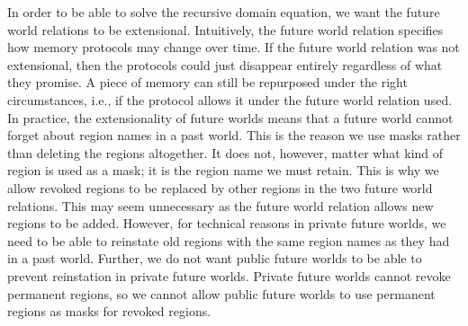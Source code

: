 \documentclass[format=acmsmall, review=true, screen=true]{acmart}
\newenvironment{toplas}{}{}
\begin{document}
\begin{toplas}
  In order to be able to solve the recursive domain equation, we want the future world relations to be extensional.
  Intuitively, the future world relation specifies how memory protocols may change over time.
  If the future world relation was not extensional, then the protocols could just disappear entirely regardless of what they promise.
  A piece of memory can still be repurposed under the right circumstances, i.e., if the protocol allows it under the future world relation used.
  In practice, the extensionality of future worlds means that a future world cannot forget about region names in a past world.
  This is the reason we use masks rather than deleting the regions altogether.
  It does not, however, matter what kind of region is used as a mask; it is the region name we must retain.
  This is why we allow revoked regions to be replaced by other regions in the two future world relations.
  This may seem unnecessary as the future world relation allows new regions to be added.
  However, for technical reasons in private future worlds, we need to be able to reinstate old regions with the same region names as they had in a past world.
  Further, we do not want public future worlds to be able to prevent reinstation in private future worlds.
  Private future worlds cannot revoke permanent regions, so we cannot allow public future worlds to use permanent regions as masks for revoked regions.
\end{toplas}



\end{document}
